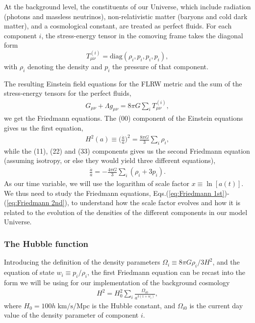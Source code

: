 \documentclass[twocolumn]{aa}
\begin{document}
At the background level, the constituents of our Universe, which include radiation (photons and massless neutrinos), non-relativistic matter (baryons and cold dark matter), and a cosmological constant, are treated as perfect fluids. For each component $i$, the stress-energy tensor in the comoving frame takes the diagonal form
\begin{equation*}
T_{\mu\nu}^{(i)} = \mathrm{diag}(\rho_i, p_i, p_i, p_i),
\end{equation*}
with $\rho_i$ denoting the density and $p_i$ the pressure of that component.

The resulting Einstein field equations for the FLRW metric and the sum of the stress-energy tensors for the perfect fluids,
\begin{align}
      G_{\mu\nu} + \Lambda g_{\mu\nu} = 8\pi G\sum_i T^{(i)}_{\mu\nu},
      \label{eq:GR}
\end{align}
we get the Friedmann equations. The (00) component of the Einstein equations gives us the first equation,
\begin{align}
      H^2(a) \equiv \bigg(\frac{\dot{a}}{a}\bigg)^2 = \frac{8\pi G}{3}\sum_i \rho_i,\label{eq:Friedmann 1st}
\end{align}
while the (11), (22) and (33) components gives us the second Friedmann equation (assuming isotropy, or else they would yield three different equations),  
\begin{align}
      \frac{\ddot{a}}{a} = -\frac{4\pi G}{3}\sum_i (\rho_i + 3p_i). \label{eq:Friedmann 2nd}
\end{align}
As our time variable, we will use the logarithm of scale factor $x\equiv \ln [a(t)]$. We thus need to study the Friedmann equations, Eqs.(\ref{eq:Friedmann 1st})-(\ref{eq:Friedmann 2nd}), to understand how the scale factor evolves and how it is related to the evolution of the densities of the different components in our model Universe.

\subsubsection{The Hubble function}
Introducing the definition of the density parameters $\Omega_i \equiv 8\pi G \rho_i/3H^2$, and the equation of state $w_i \equiv p_i/\rho_i$, the first Friedmann equation can be recast into the form we will be using for our implementation of the background cosmology
\begin{align*}
      H^2 = H_0^2\sum_i \frac{\Omega_{i0}}{a^{3(1+w_i)}},
\end{align*}
where $H_0 = 100h\; \text{km/s/Mpc}$ is the Hubble constant, and $\Omega_{i0}$ is the current day value of the density parameter of component $i$.
\end{document}
